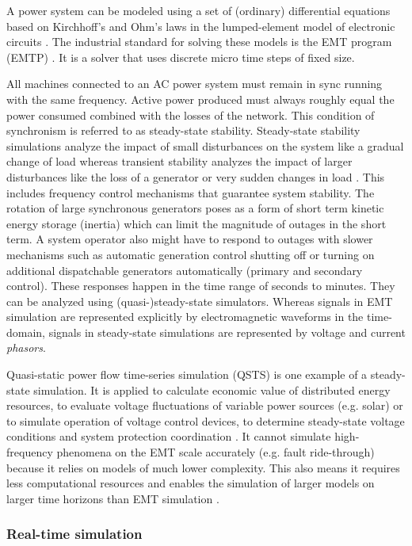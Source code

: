\documentclass[a4paper,ngerman]{atseminar}
\begin{document}
A power system can be modeled using a set of (ordinary) differential equations based on Kirchhoff's and Ohm's laws in the lumped-element model of electronic circuits \cite{watson2003}.
The industrial standard for solving these models is the EMT program (EMTP) \cite{dommel1964}. It is a solver that uses discrete micro time steps of fixed size. 

All machines connected to an AC power system must remain in sync running with the same frequency. Active power produced must always roughly equal the power consumed combined with the losses of the network. This condition of synchronism is referred to as steady-state stability. Steady-state stability simulations analyze the impact of small disturbances on the system like a gradual change of load whereas transient stability analyzes the impact of larger disturbances like the loss of a generator or very sudden changes in load \cite{sauer1998}.
This includes frequency control mechanisms that guarantee system stability. The rotation of large synchronous generators poses as a form of short term kinetic energy storage (inertia) which can limit the magnitude of outages in the short term. A system operator also might have to respond to outages with slower mechanisms such as automatic generation control shutting off or turning on additional dispatchable generators automatically (primary and secondary control). These responses happen in the time range of seconds to minutes. They can be analyzed using (quasi-)steady-state simulators. 
Whereas signals in EMT simulation are represented explicitly by electromagnetic waveforms in the time-domain, signals in steady-state simulations are represented by voltage and current \textit{phasors}.

Quasi-static power flow time-series simulation (QSTS) is one example of a steady-state simulation. It is applied to calculate economic value of distributed energy resources, to evaluate voltage fluctuations of variable power sources (e.g. solar) \cite{ieee1547.7} or to simulate operation of voltage control devices, to determine steady-state voltage conditions and system protection coordination \cite{broderick2013}.
It cannot simulate high-frequency phenomena on the EMT scale accurately (e.g. fault ride-through) because it relies on models of much lower complexity. This also means it requires less computational resources and enables the simulation of larger models on larger time horizons than EMT simulation \cite{lundstrom2017}.

\subsubsection{Real-time simulation}
\label{MH:sec:bg:real-time}
\end{document}

